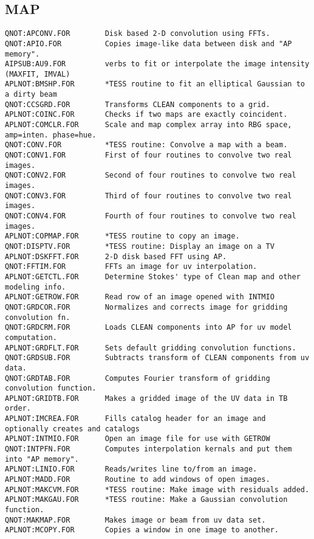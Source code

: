 \subsection{MAP}
\begin{verbatim}
QNOT:APCONV.FOR        Disk based 2-D convolution using FFTs.
QNOT:APIO.FOR          Copies image-like data between disk and "AP memory".
AIPSUB:AU9.FOR         verbs to fit or interpolate the image intensity (MAXFIT, IMVAL)
APLNOT:BMSHP.FOR       *TESS routine to fit an elliptical Gaussian to a dirty beam
QNOT:CCSGRD.FOR        Transforms CLEAN components to a grid.
APLNOT:COINC.FOR       Checks if two maps are exactly coincident.
APLNOT:COMCLR.FOR      Scale and map complex array into RBG space, amp=inten. phase=hue.
QNOT:CONV.FOR          *TESS routine: Convolve a map with a beam.
QNOT:CONV1.FOR         First of four routines to convolve two real images.
QNOT:CONV2.FOR         Second of four routines to convolve two real images.
QNOT:CONV3.FOR         Third of four routines to convolve two real images.
QNOT:CONV4.FOR         Fourth of four routines to convolve two real images.
APLNOT:COPMAP.FOR      *TESS routine to copy an image.
QNOT:DISPTV.FOR        *TESS routine: Display an image on a TV
APLNOT:DSKFFT.FOR      2-D disk based FFT using AP.
QNOT:FFTIM.FOR         FFTs an image for uv interpolation.
APLNOT:GETCTL.FOR      Determine Stokes' type of Clean map and other modeling info.
APLNOT:GETROW.FOR      Read row of an image opened with INTMIO
QNOT:GRDCOR.FOR        Normalizes and corrects image for gridding convolution fn.
QNOT:GRDCRM.FOR        Loads CLEAN components into AP for uv model computation.
APLNOT:GRDFLT.FOR      Sets default gridding convolution functions.
QNOT:GRDSUB.FOR        Subtracts transform of CLEAN components from uv data.
QNOT:GRDTAB.FOR        Computes Fourier transform of gridding convolution function.
APLNOT:GRIDTB.FOR      Makes a gridded image of the UV data in TB order.
APLNOT:IMCREA.FOR      Fills catalog header for an image and optionally creates and catalogs
APLNOT:INTMIO.FOR      Open an image file for use with GETROW
QNOT:INTPFN.FOR        Computes interpolation kernals and put them into "AP memory".
APLNOT:LINIO.FOR       Reads/writes line to/from an image.
APLNOT:MADD.FOR        Routine to add windows of open images.
APLNOT:MAKCVM.FOR      *TESS routine: Make image with residuals added.
APLNOT:MAKGAU.FOR      *TESS routine: Make a Gaussian convolution function.
QNOT:MAKMAP.FOR        Makes image or beam from uv data set.
APLNOT:MCOPY.FOR       Copies a window in one image to another.

\end{verbatim}

